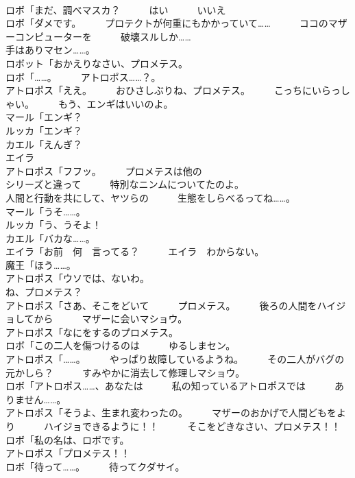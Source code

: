 \documentclass[8pt]{extreport}
\begin{document}
\begin{CJK}{UTF8}{min}
\\	ロボ「まだ、調べマスカ？　　　はい　　　いいえ	
\\	ロボ「ダメです。　　　プロテクトが何重にもかかっていて……　　　ココのマザーコンピューターを　　　破壊スルしか……	
\\	手はありマセン……。	
\\	ロボット「おかえりなさい、プロメテス。	
\\	ロボ「……。　　　アトロポス……？。	
\\	アトロポス「ええ。　　　おひさしぶりね、プロメテス。　　　こっちにいらっしゃい。　　　もう、エンギはいいのよ。	
\\	マール「エンギ？	
\\	ルッカ「エンギ？	
\\	カエル「えんぎ？	
\\	エイラ
\\	アトロポス「フフッ。　　　プロメテスは他の
\\	シリーズと違って　　　特別なニンムについてたのよ。	
\\	人間と行動を共にして、ヤツらの　　　生態をしらべるってね……。	
\\	マール「うそ……。	
\\	ルッカ「う、うそよ！	
\\	カエル「バカな……。	
\\	エイラ「お前　何　言ってる？　　　エイラ　わからない。	
\\	魔王「ほう……。	
\\	アトロポス「ウソでは、ないわ。	
\\	ね、プロメテス？	
\\	アトロポス「さあ、そこをどいて　　　プロメテス。　　　後ろの人間をハイジョしてから　　　マザーに会いマショウ。	
\\	アトロポス「なにをするのプロメテス。	
\\	ロボ「この二人を傷つけるのは　　　ゆるしまセン。	
\\	アトロポス「……。　　　やっぱり故障しているようね。　　　その二人がバグの元かしら？　　　すみやかに消去して修理しマショウ。	
\\	ロボ「アトロポス……、あなたは　　　私の知っているアトロポスでは　　　ありません……。	
\\	アトロポス「そうよ、生まれ変わったの。　　　マザーのおかげで人間どもをより　　　ハイジョできるように！！　　　そこをどきなさい、プロメテス！！	
\\	ロボ「私の名は、ロボです。	
\\	アトロポス「プロメテス！！	
\\	ロボ「待って……。　　　待ってクダサイ。	

\end{CJK}
\end{document}
